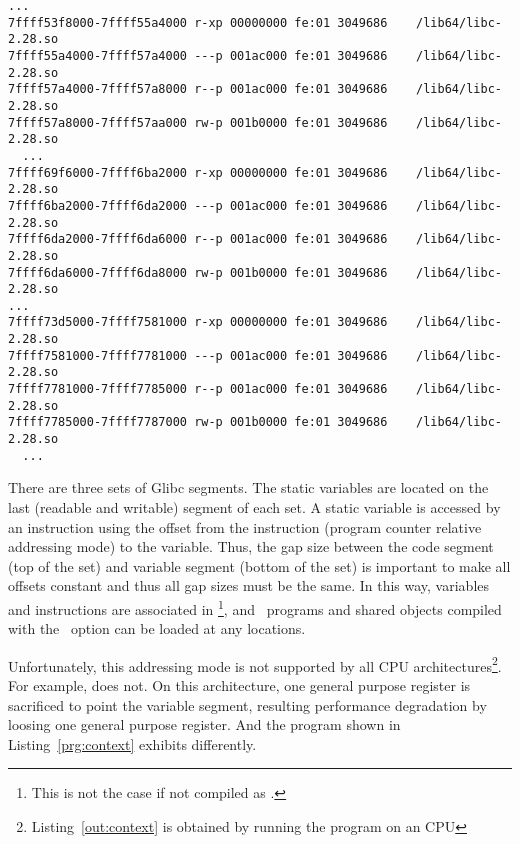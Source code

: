 \begin{lstlisting}[basicstyle=\tiny\tt, frame=tRBl, label=out:glibc-segs]
  ...
7ffff53f8000-7ffff55a4000 r-xp 00000000 fe:01 3049686    /lib64/libc-2.28.so
7ffff55a4000-7ffff57a4000 ---p 001ac000 fe:01 3049686    /lib64/libc-2.28.so
7ffff57a4000-7ffff57a8000 r--p 001ac000 fe:01 3049686    /lib64/libc-2.28.so
7ffff57a8000-7ffff57aa000 rw-p 001b0000 fe:01 3049686    /lib64/libc-2.28.so
  ...
7ffff69f6000-7ffff6ba2000 r-xp 00000000 fe:01 3049686    /lib64/libc-2.28.so
7ffff6ba2000-7ffff6da2000 ---p 001ac000 fe:01 3049686    /lib64/libc-2.28.so
7ffff6da2000-7ffff6da6000 r--p 001ac000 fe:01 3049686    /lib64/libc-2.28.so
7ffff6da6000-7ffff6da8000 rw-p 001b0000 fe:01 3049686    /lib64/libc-2.28.so
...
7ffff73d5000-7ffff7581000 r-xp 00000000 fe:01 3049686    /lib64/libc-2.28.so
7ffff7581000-7ffff7781000 ---p 001ac000 fe:01 3049686    /lib64/libc-2.28.so
7ffff7781000-7ffff7785000 r--p 001ac000 fe:01 3049686    /lib64/libc-2.28.so
7ffff7785000-7ffff7787000 rw-p 001b0000 fe:01 3049686    /lib64/libc-2.28.so
  ...
\end{lstlisting}

There are three sets of Glibc segments. The static variables are
located on the last (readable and writable) segment of each set. A
static variable is accessed by an instruction using the offset from
the instruction (program counter relative addressing mode) to the
variable. Thus, the gap size between the code segment (top of the set)
and variable segment (bottom of the set) is important to make all
offsets constant and thus all gap sizes must be the same. In this way,
variables and instructions are associated in \PIE\footnote{This is
not the case if not compiled as \PIE.}, and \PIE\ programs and shared
objects compiled with the \PIC\ option can be loaded at any locations.

Unfortunately, this addressing mode is not supported by all CPU
architectures\footnote{Listing~\ref{out:context} is obtained by
running the program on an  CPU}. For example,  
does not. On this architecture, one general purpose
register is sacrificed to point the variable segment, resulting
performance degradation by loosing one general purpose register. And
the program shown in Listing~\ref{prg:context} exhibits differently. 
